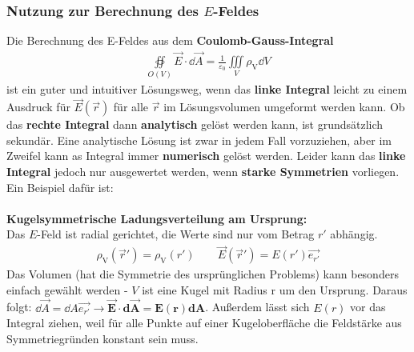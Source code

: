 	  \subsubsection{Nutzung zur Berechnung des $E$-Feldes}
			   Die Berechnung des E-Feldes aus dem
			        \textbf{Coulomb-Gauss-Integral}
			        \begin{equation}\begin{split}
					        \oiint\limits_{O(V)}
					        \vec{E} \cdot \dd\vec{A} = \frac{1}{\varepsilon_0}
					        \iiint\limits_{V} \rho_\text{V} \dd V
				        \end{split}\end{equation}
			        ist ein guter und intuitiver Lösungsweg, wenn das \textbf{linke Integral}
			        leicht zu einem Ausdruck für $\vec{E}(\vec{r} )$ für alle
			        $\vec{r} $ im Lösungsvolumen umgeformt werden kann.
			   Ob das \textbf{rechte Integral} dann \textbf{analytisch}
			        gelöst werden kann, ist grundsätzlich sekundär.
			   Eine
			        analytische Lösung ist zwar in jedem Fall vorzuziehen, aber im
			        Zweifel kann as Integral immer \textbf{numerisch} gelöst
			        werden.
			   Leider kann das \textbf{linke Integral} jedoch nur
			        ausgewertet werden, wenn \textbf{starke Symmetrien} vorliegen. Ein Beispiel dafür ist:\\\\
			        \textbf{Kugelsymmetrische Ladungsverteilung am Ursprung:}\\
			        Das $E$-Feld ist radial gerichtet, die Werte sind nur vom Betrag $r'$ abhängig.
			        \begin{equation}\begin{split}
			        		\rho_\text{V} (\vec{r}' ) =  \rho_\text{V}(r') \qquad \vec{E} (\vec{r}' ) = E(r')\vec{e_{r'}}
			        \end{split}\end{equation}
			        Das Volumen (hat die Symmetrie des ursprünglichen Problems) kann besonders einfach gewählt werden - $V$ ist eine Kugel mit Radius r um den Ursprung. Daraus folgt: $\dd\vec{A} =
			        \dd A \vec{e_{r'}}   \rightarrow \vec{\bm{E}} \cdot
			        \textbf{d}\vec{\bm{A}} = \bm{E(r) \textbf{d} A}$. Außerdem lässt sich $E(r)$ vor das Integral ziehen, weil für alle Punkte auf einer Kugeloberfläche die Feldstärke aus Symmetriegründen konstant sein muss. 

